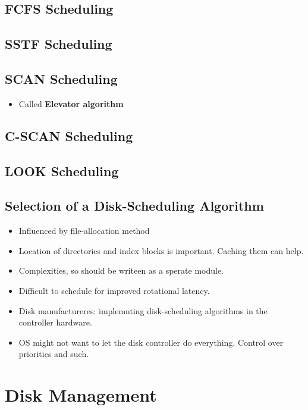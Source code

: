 \documentclass[10pt]{report}
\begin{document}
		\subsection{FCFS Scheduling}

		\subsection{SSTF Scheduling}

		\subsection{SCAN Scheduling}
			\begin{itemize}
				\item Called \textbf{Elevator algorithm}
			\end{itemize}

		\subsection{C-SCAN Scheduling}

		\subsection{LOOK Scheduling}

		\subsection{Selection of a Disk-Scheduling Algorithm}
			\begin{itemize}
				\item Influenced by file-allocation method
				\item Location of directories and index blocks is important. Caching them can help.
				\item Complexities, so should be writeen as a sperate module.
				\item Difficult to schedule for improved rotational latency.
				\item Disk manufactureres: implemnting disk-scheduling algorithms in the controller hardware.
				\item OS might not want to let the disk controller do everything. Control over priorities and such.
			\end{itemize}

	\section{Disk Management}
\end{document}

